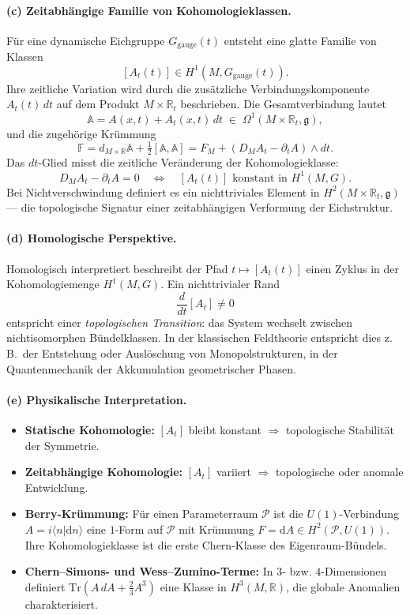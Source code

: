 \documentclass[10pt, letterpaper]{article}
\begin{document}
\paragraph{(c) Zeitabhängige Familie von Kohomologieklassen.}
Für eine dynamische Eichgruppe $G_\mathrm{gauge}(t)$
entsteht eine glatte Familie von Klassen
\[
[A_t(t)]\in H^1(M,G_\mathrm{gauge}(t)).
\]
Ihre zeitliche Variation wird durch die zusätzliche
Verbindungskomponente $A_t(t)\,dt$
auf dem Produkt $M\times\mathbb R_t$ beschrieben.
Die Gesamtverbindung lautet
\[
\mathbb A = A(x,t) + A_t(x,t)\,dt
\;\in\;
\Omega^1(M\times\mathbb R_t,\mathfrak g),
\]
und die zugehörige Krümmung
\[
\mathbb F = d_{M\times\mathbb R}\mathbb A + \tfrac12[\mathbb A,\mathbb A]
= F_M + (D_MA_t-\partial_tA)\wedge dt.
\]
Das $dt$-Glied misst die zeitliche Veränderung der Kohomologieklasse:
\[
D_MA_t-\partial_tA=0
\quad\Leftrightarrow\quad
[A_t(t)]\text{ konstant in }H^1(M,G).
\]
Bei Nichtverschwindung definiert es ein nichttriviales
Element in $H^2(M\times\mathbb R_t,\mathfrak g)$
— die topologische Signatur einer zeitabhängigen
Verformung der Eichstruktur.

\paragraph{(d) Homologische Perspektive.}
Homologisch interpretiert beschreibt der Pfad
$t\mapsto [A_t(t)]$ einen Zyklus in der Kohomologiemenge $H^1(M,G)$.
Ein nichttrivialer Rand
\[
\frac{d}{dt}[A_t]\neq0
\]
entspricht einer \emph{topologischen Transition}:
das System wechselt zwischen nichtisomorphen
Bündelklassen. In der klassischen Feldtheorie entspricht dies
z.\,B.\ der Entstehung oder Auslöschung von Monopolstrukturen,
in der Quantenmechanik der Akkumulation geometrischer Phasen.

\paragraph{(e) Physikalische Interpretation.}
\begin{itemize}
\item \textbf{Statische Kohomologie:}
  $[A_t]$ bleibt konstant $\Rightarrow$ topologische Stabilität der Symmetrie.
\item \textbf{Zeitabhängige Kohomologie:}
  $[A_t]$ variiert $\Rightarrow$ topologische oder anomale Entwicklung.
\item \textbf{Berry-Krümmung:}
  Für einen Parameterraum $\mathcal P$ ist die $U(1)$-Verbindung
  $A=i\langle n|\mathrm d n\rangle$
  eine $1$-Form auf $\mathcal P$ mit Krümmung
  $F=\mathrm dA\in H^2(\mathcal P,U(1))$.
  Ihre Kohomologieklasse ist die erste Chern-Klasse des
  Eigenraum-Bündels.
\item \textbf{Chern–Simons- und Wess–Zumino-Terme:}
  In $3$- bzw. $4$-Dimensionen definiert $\mathrm{Tr}(A\,dA+\tfrac23A^3)$
  eine Klasse in $H^3(M,\mathbb R)$, die globale Anomalien charakterisiert.
\end{itemize}
\end{document}
